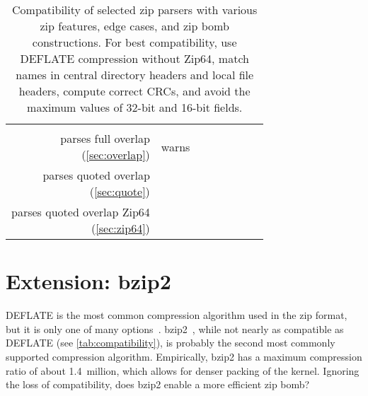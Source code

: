 \documentclass[letterpaper,twocolumn,10pt]{article}
\newcommand{\yes}{\cellcolor{YellowGreen}\checkmark}
\newcommand{\no}{\cellcolor{Bittersweet}\ding{55}}
\newcommand{\maybe}[1]{\cellcolor{GreenYellow}#1}
\begin{document}
\begin{table*}
\begin{tabular}{rccccccc}
\href{https://github.com/jbangert/nail/blob/4bd9cc29c4092abe7a77f8294aff2337bba02ec5/examples/zip/zip.nail#L79}{\yes} &
\href{https://android.googlesource.com/platform/system/core/+/refs/tags/android-9.0.0_r1/libziparchive/zip_archive_common.h#51}{\yes} &
\href{https://github.com/madler/sunzip/blob/master/sunzip.c#L1139}{\yes}
\\
\noalign{\vspace{0.5em}}
\thead[r]{parses full overlap\\(\autoref{sec:overlap})} &
\maybe{warns} &
\no &
\yes &
\yes &
\yes &
\no &
\no
\\
\thead[r]{parses quoted overlap\\(\autoref{sec:quote})} &
\yes &
\yes &
\yes &
\yes &
\yes &
\yes &
\no
\\
\thead[r]{parses quoted overlap Zip64\\(\autoref{sec:zip64})} &
\yes &
\yes &
\yes &
\yes &
\no &
\no &
\no
\end{tabular}
\caption{
Compatibility of selected zip parsers with various zip features,
edge cases,
and zip bomb constructions.
For best compatibility,
use DEFLATE compression without Zip64,
match names in central directory headers and local file headers,
compute correct CRCs,
and avoid the maximum values of 32-bit and 16-bit fields.
}
\label{tab:compatibility}
\end{table*}


\section{Extension: bzip2}
\label{sec:bzip2}

DEFLATE is the most common compression algorithm
used in the zip format, but it is only one of many options~\cite[\S 4.4.5]{appnote}.
bzip2~\cite{bzip2}, while not nearly as compatible as DEFLATE (see \autoref{tab:compatibility}),
is probably the second most commonly supported compression algorithm.
Empirically, bzip2 has a maximum compression ratio of about 1.4~million,
which allows for denser packing of the kernel.
Ignoring the loss of compatibility,
does bzip2 enable a more efficient zip bomb?

\end{document}
